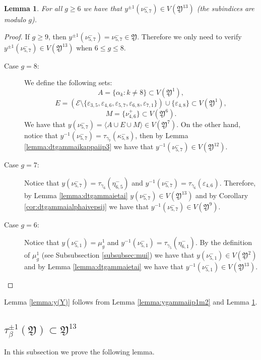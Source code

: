 \documentclass{artv3}
\newtheorem{lemma}[theorem]{Lemma}
\newcommand*{\veps}{\varepsilon}
\newcommand*{\dt}[1]{\tau_{#1}}
\newcommand{\E}{\mathcal{E}}
\newcommand*{\Y}{\mathfrak{Y}}
\begin{document}
\begin{lemma}\label{lemma:ypmmu57m}
For all $g\geq 6$ we have that $y^{\pm 1}(\nu_{5,7}^{-}) \in V(\Y^{13})$ (the subindices are modulo $g$).
\end{lemma}
\begin{proof}
If $g\geq 9 $, then $y^{\pm 1}(\nu_{5,7}^{-}) = \nu_{5,7}^{-} \in \Y$. Therefore we only need to verify  $y^{\pm 1}(\nu_{5,7}^{-}) \in V(\Y^{13})$ when $6\leq g \leq 8$. 
\begin{description}
\item[Case $g=8$:] We define the following sets:
$$A = \{ \alpha_{k} : k\neq 8\}\subset V(\Y^{1}),$$
$$E = (\E \setminus \{\veps_{3,5}, \veps_{4,6},\veps_{5,7}, \veps_{6,8}, \veps_{7,1} \}) \cup \{\veps_{4,8}\}\subset V(\Y^{1}),$$
$$M = \{\nu_{4,6}^{+} \}\subset V(\Y^{6}).$$
We have that $y(\nu_{5,7}^{-}) = \langle A \cup E \cup M \rangle\in V(\Y^{7})$. On the other hand, notice that $y^{-1}(\nu_{5,7}^{-}) = \dt{\gamma_7}(\kappa_{5,8}^{-})$, then by Lemma \ref{lemma:dtgammaikappaiip3} we have that $y^{-1}(\nu_{5,7}^{-})\in V(\Y^{12})$.
\item[Case $g=7$:]Notice that $y(\nu_{5,7}^{-}) = \dt{\gamma_6}(\eta_{6,5}^{-})$ and $y^{-1}(\nu_{5,7}^{-}) = \dt{\gamma_6}(\veps_{4,6})$. Therefore, by Lemma \ref{lemma:dtgammaietai}  $y(\nu_{5,7}^{-})\in V(\Y^{13})$ and by Corollary \ref{cor:dtgammaialphaivepsij} we have that $y^{-1}(\nu_{5,7}^{-}) \in V(\Y^{9})$.
\item[Case $g=6$:]Notice that $y(\nu_{5,1}^{-}) = \mu_{g}^{1}$ and $y^{-1}(\nu_{5,1}^{-}) = \dt{\gamma_5}(\eta_{6,1}^{-})$. By the definition of $\mu_{g}^{1}$ (see Subsubsection \ref{subsubsec:mui}) we have that $y(\nu_{5,1}^{-})\in V(\Y^{2})$ and by Lemma \ref{lemma:dtgammaietai} we have that $y^{-1}(\nu_{5,1}^{-})\in V(\Y^{13})$.
\end{description} 
\end{proof}

Lemma \ref{lemma:y(Y)} follows from Lemma \ref{lemma:ygammaiip1m2} and Lemma \ref{lemma:ypmmu57m}.



\subsection{$\tau_{\beta}^{\pm 1}(\Y)\subset \Y^{13}$}\label{subsec:y(Y)}

In this subsection we prove the following lemma.
\end{document}
